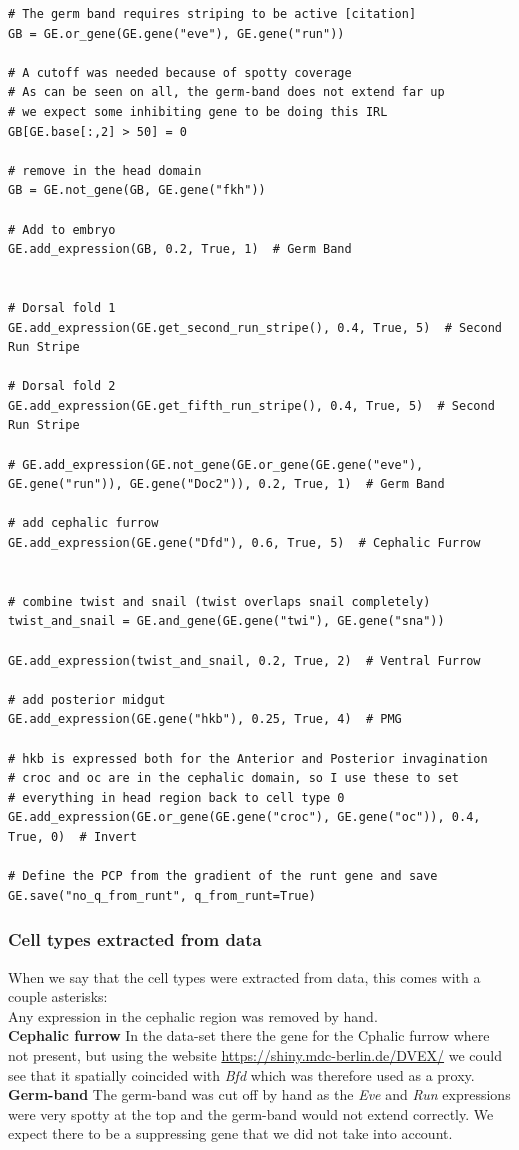 \begin{lstlisting}
# The germ band requires striping to be active [citation]
GB = GE.or_gene(GE.gene("eve"), GE.gene("run"))

# A cutoff was needed because of spotty coverage
# As can be seen on all, the germ-band does not extend far up
# we expect some inhibiting gene to be doing this IRL
GB[GE.base[:,2] > 50] = 0

# remove in the head domain
GB = GE.not_gene(GB, GE.gene("fkh"))

# Add to embryo
GE.add_expression(GB, 0.2, True, 1)  # Germ Band


# Dorsal fold 1
GE.add_expression(GE.get_second_run_stripe(), 0.4, True, 5)  # Second Run Stripe

# Dorsal fold 2
GE.add_expression(GE.get_fifth_run_stripe(), 0.4, True, 5)  # Second Run Stripe

# GE.add_expression(GE.not_gene(GE.or_gene(GE.gene("eve"), GE.gene("run")), GE.gene("Doc2")), 0.2, True, 1)  # Germ Band

# add cephalic furrow
GE.add_expression(GE.gene("Dfd"), 0.6, True, 5)  # Cephalic Furrow


# combine twist and snail (twist overlaps snail completely)
twist_and_snail = GE.and_gene(GE.gene("twi"), GE.gene("sna"))

GE.add_expression(twist_and_snail, 0.2, True, 2)  # Ventral Furrow

# add posterior midgut
GE.add_expression(GE.gene("hkb"), 0.25, True, 4)  # PMG

# hkb is expressed both for the Anterior and Posterior invagination
# croc and oc are in the cephalic domain, so I use these to set 
# everything in head region back to cell type 0
GE.add_expression(GE.or_gene(GE.gene("croc"), GE.gene("oc")), 0.4, True, 0)  # Invert

# Define the PCP from the gradient of the runt gene and save
GE.save("no_q_from_runt", q_from_runt=True)
\end{lstlisting}

\subsubsection{Cell types extracted from data}
When we say that the cell types were extracted from data, this comes with a couple asterisks:\\
Any expression in the cephalic region was removed by hand.\\
\textbf{Cephalic furrow}
In the data-set there the gene for the Cphalic furrow where not present, but using the website \url{https://shiny.mdc-berlin.de/DVEX/} we could see that it spatially coincided with \textit{Bfd} which was therefore used as a proxy. 
\textbf{Germ-band}
The germ-band was cut off by hand as the \textit{Eve} and \textit{Run} expressions were very spotty at the top and the germ-band would not extend correctly. We expect there to be a suppressing gene that we did not take into account. 

